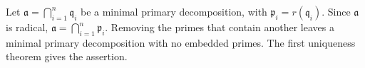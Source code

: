 Let $\mathfrak{a}=\bigcap_{i=1}^n\mathfrak{q}_i$ be a minimal primary decomposition, with $\mathfrak{p}_i=r(\mathfrak{q}_i)$. Since $\mathfrak{a}$ is radical, $\mathfrak{a}=\bigcap_{i=1}^n\mathfrak{p}_i$. Removing the primes that contain another leaves a minimal primary decomposition with no embedded primes. The first uniqueness theorem gives the assertion.
